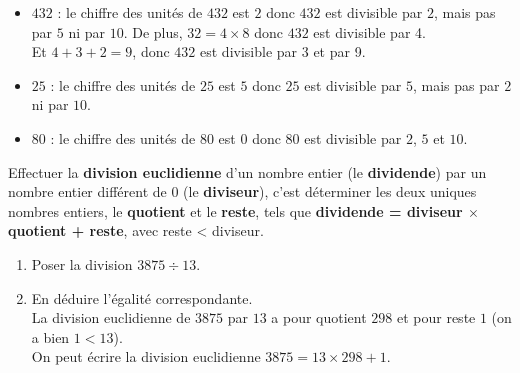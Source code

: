 \begin{Exemples}
\begin{itemize}[label=\textcolor{Couleur8}{$\bullet$}]
\item $432$ : le chiffre des unités de $432$ est $2$ donc $432$ est divisible par $2$, mais pas par $5$ ni par $10$. De plus, $32=4\times8$ donc $432$ est divisible par 4. \\
Et $4+3+2=9$, donc $432$ est divisible par 3 et par 9.
\item $25$ : le chiffre des unités de $25$ est $5$ donc $25$ est divisible par $5$, mais pas par $2$ ni par $10$.
\item $80$ : le chiffre des unités de $80$ est $0$ donc $80$ est divisible par $2$, $5$ et $10$.
\end{itemize}
\end{Exemples}

\begin{Définition*}[c]
Effectuer la \textbf{division euclidienne} d'un nombre entier (le \textbf{dividende}) par un nombre entier différent de $0$ (le \textbf{diviseur}), c'est déterminer les deux uniques nombres entiers, le \textbf{quotient} et le \textbf{reste}, tels que \textcolor{Couleur6}{\textbf{dividende = diviseur $\times$ quotient + reste}}, avec reste < diviseur.
\end{Définition*}

\begin{Exemple}
\begin{minipage}{0.6\textwidth}
\begin{enumerate}
\item Poser la division $3875 \div 13$.
\item En déduire l'égalité correspondante. \\
La division euclidienne de $3875$ par $13$ a pour quotient $298$ et pour reste $1$ (on a bien $1 < 13$). \\
On peut écrire la division euclidienne $3875 = 13 \times 298 + 1$.\\
\end{enumerate}
\end{minipage}
\hfill
\begin{minipage}{0.4\textwidth}
\begin{center}
\end{center}
\end{minipage}

\end{Exemple}



